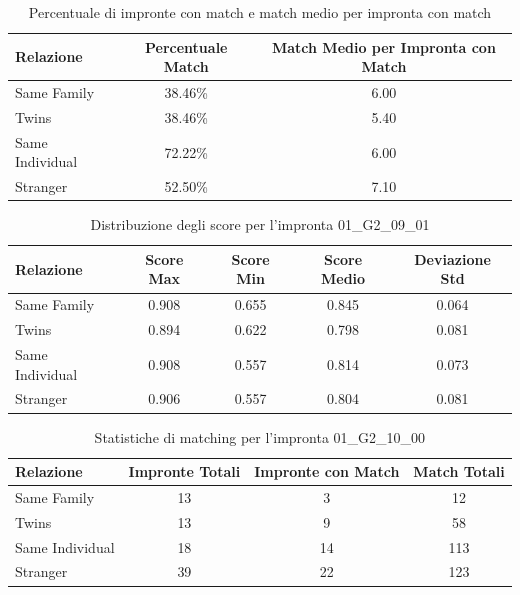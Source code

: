 \begin{table}[htbp]
\centering
\caption{Percentuale di impronte con match e match medio per impronta con match}
\label{tab:match_percentage_01_G2_09_01}
\begin{tabular}{|l|c|c|}
\hline
\textbf{Relazione} & \textbf{Percentuale Match} & \textbf{Match Medio per Impronta con Match} \\
\hline
Same Family & 38.46\% & 6.00 \\
\hline
Twins & 38.46\% & 5.40 \\
\hline
Same Individual & 72.22\% & 6.00 \\
\hline
Stranger & 52.50\% & 7.10 \\
\hline
\end{tabular}
\end{table}


\begin{table}[htbp]
\centering
\caption{Distribuzione degli score per l'impronta 01\_G2\_09\_01}
\label{tab:scores_01_G2_09_01}
\begin{tabular}{|l|c|c|c|c|}
\hline
\textbf{Relazione} & \textbf{Score Max} & \textbf{Score Min} & \textbf{Score Medio} & \textbf{Deviazione Std} \\
\hline
Same Family & 0.908 & 0.655 & 0.845 & 0.064 \\
\hline
Twins & 0.894 & 0.622 & 0.798 & 0.081 \\
\hline
Same Individual & 0.908 & 0.557 & 0.814 & 0.073 \\
\hline
Stranger & 0.906 & 0.557 & 0.804 & 0.081 \\
\hline
\end{tabular}
\end{table}


\begin{table}[htbp]
\centering
\caption{Statistiche di matching per l'impronta 01\_G2\_10\_00}
\label{tab:results_01_G2_10_00}
\begin{tabular}{|l|c|c|c|}
\hline
\textbf{Relazione} & \textbf{Impronte Totali} & \textbf{Impronte con Match} & \textbf{Match Totali} \\
\hline
Same Family & 13 & 3 & 12 \\
\hline
Twins & 13 & 9 & 58 \\
\hline
Same Individual & 18 & 14 & 113 \\
\hline
Stranger & 39 & 22 & 123 \\
\hline
\end{tabular}
\end{table}


